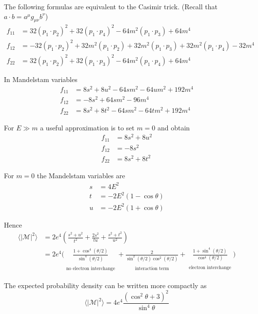The following formulas are equivalent to the Casimir trick.
(Recall that $a\cdot b=a^\mu g_{\mu\nu}b^\nu$)
\begin{align*}
f_{11}&=
32 (p_1\cdot p_2)^2 +
32 (p_1\cdot p_4)^2 -
64 m^2 (p_1\cdot p_3) + 64 m^4
\\
f_{12}&=
-32 (p_1\cdot p_2)^2 +
32 m^2 (p_1\cdot p_2) +
32 m^2 (p_1\cdot p_3) +
32 m^2 (p_1\cdot p_4) - 32m^4
\\
f_{22}&=
32 (p_1\cdot p_2)^2 +
32 (p_1\cdot p_3)^2 -
64 m^2 (p_1\cdot p_4) + 64 m^4
\end{align*}

In Mandelstam variables
\begin{align*}
f_{11} &= 8 s^2 + 8 u^2 - 64 s m^2 - 64 u m^2 + 192 m^4
\\
f_{12} &= -8 s^2 + 64 s m^2 - 96 m^4
\\
f_{22} &= 8 s^2 + 8 t^2 - 64 s m^2 - 64 t m^2 + 192 m^4
\end{align*}

For $E\gg m$ a useful approximation is to set $m=0$ and obtain
\begin{align*}
f_{11}&=8s^2+8u^2\\
f_{12}&=-8s^2\\
f_{22}&=8s^2+8t^2
\end{align*}

For $m=0$ the Mandelstam variables are
\begin{align*}
s&=4E^2
\\
t&=-2E^2(1-\cos\theta)
\\
u&=-2E^2(1+\cos\theta)
\end{align*}

Hence
\begin{align*}
\langle|\mathcal{M}|^2\rangle
&=2e^4
\left(
\frac{s^2+u^2}{t^2}+\frac{2s^2}{tu}+\frac{s^2+t^2}{u^2}
\right)
\\
&=2e^4\biggl(
\underset{\substack{\\[1ex]\text{no electron interchange}}}
{\frac{1+\cos^4(\theta/2)}{\sin^4(\theta/2)}}
+
\underset{\substack{\\[1ex]\text{interaction term}}}
{\frac{2}{\sin^2(\theta/2)\cos^2(\theta/2)}}
+
\underset{\substack{\\[1ex]\text{electron interchange}}}
{\frac{1+\sin^4(\theta/2)}{\cos^4(\theta/2)}}
\biggr)
\end{align*}

The expected probability density can be written more compactly as
\begin{equation*}
\langle|\mathcal{M}|^2\rangle=4e^4\frac{(\cos^2\theta+3)^2}{\sin^4\theta}
\end{equation*}

